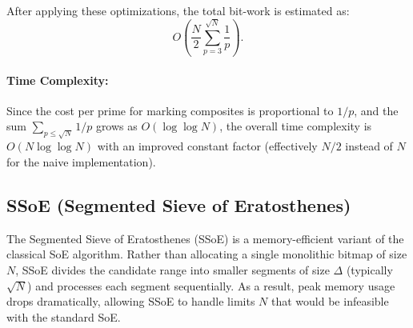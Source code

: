 \documentclass{article}
\begin{document}
After applying these optimizations, the total bit-work is estimated as:
\[
O\left(\frac{N}{2}\sum_{p=3}^{\sqrt N}\frac{1}{p}\right).
\]

\paragraph{Time Complexity:} Since the cost per prime for marking composites is proportional to $1/p$, and the sum $\sum_{p \le \sqrt{N}} 1/p$ grows as $O(\log \log N)$, the overall time complexity is $O(N \log \log N)$ with an improved constant factor (effectively $N/2$ instead of $N$ for the naive implementation).

\subsection{SSoE (Segmented Sieve of Eratosthenes)} \label{alg:ssoe}

The Segmented Sieve of Eratosthenes (SSoE) is a memory-efficient variant of the classical SoE algorithm. Rather than allocating a single monolithic bitmap of size $N$, SSoE divides the candidate range into smaller segments of size $\Delta$ (typically $\sqrt{N}$) and processes each segment sequentially. 
As a result, peak memory usage drops dramatically, allowing SSoE to handle limits $N$ that would be infeasible with the standard SoE.
\end{document}
